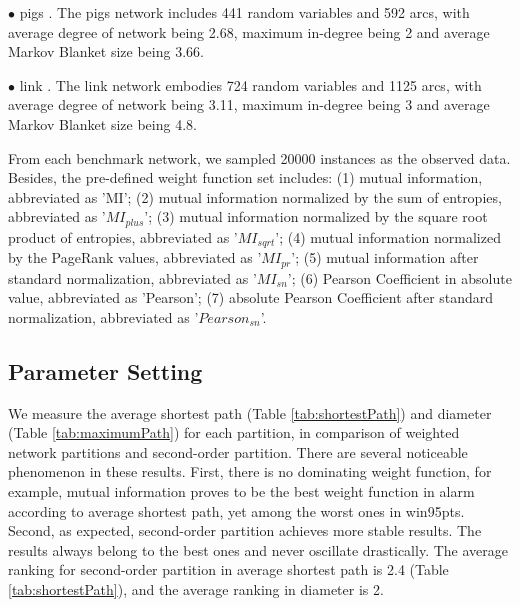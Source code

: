 $\bullet$ pigs \cite{pigs}. The pigs network includes 441 random variables and 592 arcs, with average degree of network being 2.68, maximum in-degree being 2 and average Markov Blanket size being 3.66.

$\bullet$ link \cite{link}. The link network embodies 724 random variables and 1125 arcs, with average degree of network being 3.11, maximum in-degree being 3 and average Markov Blanket size being 4.8.

From each benchmark network, we sampled 20000 instances as the observed data. Besides, the pre-defined weight function set includes: (1) mutual information, abbreviated as 'MI'; (2) mutual information normalized by the sum of entropies, abbreviated as '$MI_{plus}$'; (3) mutual information normalized by the square root product of entropies, abbreviated as '$MI_{sqrt}$'; (4) mutual information normalized by the PageRank values, abbreviated as '$MI_{pr}$'; (5) mutual information after standard normalization, abbreviated as '$MI_{sn}$'; (6) Pearson Coefficient in absolute value, abbreviated as 'Pearson'; (7) absolute Pearson Coefficient after standard normalization, abbreviated as '$Pearson_{sn}$'.

\subsection{Parameter Setting}
\label{exp:ParamSet}


We measure the average shortest path (Table \ref{tab:shortestPath}) and diameter (Table \ref{tab:maximumPath}) for each partition, in comparison of weighted network partitions and second-order partition. There are several noticeable phenomenon in these results. First, there is no dominating weight function, for example, mutual information proves to be the best weight function in alarm according to average shortest path, yet among the worst ones in win95pts. Second, as expected, second-order partition achieves more stable results. The results always belong to the best ones and never oscillate drastically. The average ranking for second-order partition in average shortest path is 2.4 (Table \ref{tab:shortestPath}), and the average ranking in diameter is 2.

